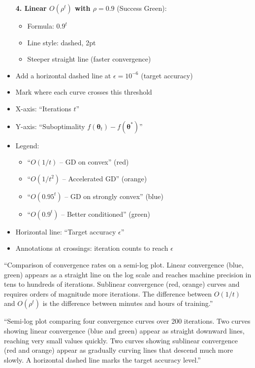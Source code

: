 \documentclass[12pt]{article}
\begin{document}
\begin{description}[style=nextline, leftmargin=0pt]
\begin{itemize}
        \textbf{4. Linear $O(\rho^t)$ with $\rho = 0.9$} (Success Green):
        \begin{itemize}
            \item Formula: $0.9^t$
            \item Line style: dashed, 2pt
            \item Steeper straight line (faster convergence)
        \end{itemize}

        \item Add a horizontal dashed line at $\epsilon = 10^{-6}$ (target accuracy)
        \item Mark where each curve crosses this threshold
    \end{itemize}

    \item[Required Labels]
    \begin{itemize}
        \item X-axis: ``Iterations $t$''
        \item Y-axis: ``Suboptimality $f(\boldsymbol{\theta}_t) - f(\boldsymbol{\theta}^*)$''
        \item Legend:
        \begin{itemize}
            \item ``$O(1/t)$ -- GD on convex'' (red)
            \item ``$O(1/t^2)$ -- Accelerated GD'' (orange)
            \item ``$O(0.95^t)$ -- GD on strongly convex'' (blue)
            \item ``$O(0.9^t)$ -- Better conditioned'' (green)
        \end{itemize}
        \item Horizontal line: ``Target accuracy $\epsilon$''
        \item Annotations at crossings: iteration counts to reach $\epsilon$
    \end{itemize}

    \item[Caption Text]
    ``Comparison of convergence rates on a semi-log plot. Linear convergence (blue, green) appears as a straight line on the log scale and reaches machine precision in tens to hundreds of iterations. Sublinear convergence (red, orange) curves and requires orders of magnitude more iterations. The difference between $O(1/t)$ and $O(\rho^t)$ is the difference between minutes and hours of training.''

    \item[Alt-Text for Accessibility]
    ``Semi-log plot comparing four convergence curves over 200 iterations. Two curves showing linear convergence (blue and green) appear as straight downward lines, reaching very small values quickly. Two curves showing sublinear convergence (red and orange) appear as gradually curving lines that descend much more slowly. A horizontal dashed line marks the target accuracy level.''
\end{description}
\end{document}
